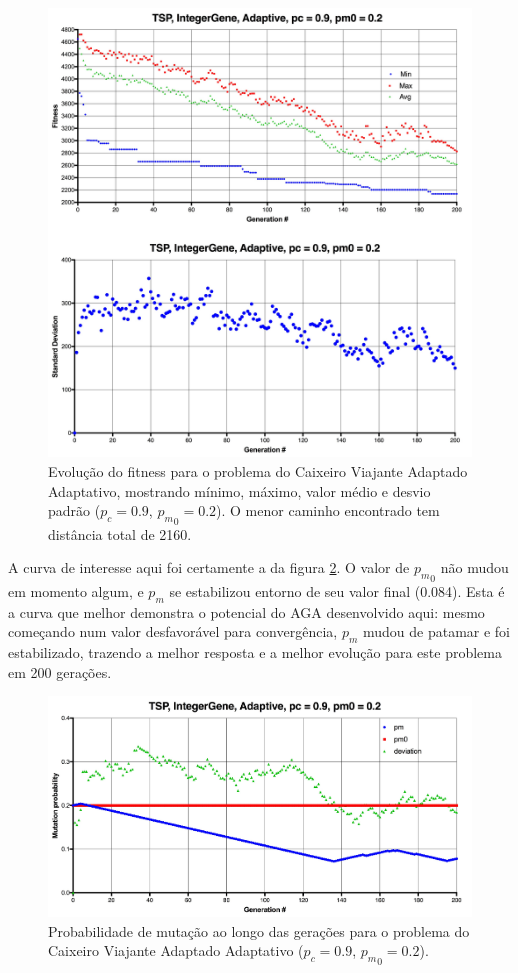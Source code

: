 \begin{figure}[ht!]
    \centering \includegraphics[width=1.0\textwidth]{tsp_02_adaptive.jpg}
    \caption{Evolução do fitness para o problema do Caixeiro Viajante Adaptado Adaptativo, mostrando mínimo, máximo, valor médio e desvio padrão ($p_c=0.9$, ${p_m}_0=0.2$). O menor caminho encontrado tem distância total de 2160.}
    \label{fig:tsp_02_adaptative}
\end{figure}

A curva de interesse aqui foi certamente a da figura \ref{fig:tsp_02_adaptive_pm}. O valor de ${p_m}_0$ não mudou em momento algum, e $p_m$ se estabilizou entorno de seu valor final (0.084). Esta é a curva que melhor demonstra o potencial do AGA desenvolvido aqui: mesmo começando num valor desfavorável para convergência, $p_m$ mudou de patamar e foi estabilizado, trazendo a melhor resposta e a melhor evolução para este problema em 200 gerações.

\begin{figure}[ht!]
    \centering \includegraphics[width=1.0\textwidth]{tsp_02_adaptive_pm.jpg}
    \caption{Probabilidade de mutação ao longo das gerações para o problema do Caixeiro Viajante Adaptado Adaptativo ($p_c=0.9$, ${p_m}_0=0.2$).}
    \label{fig:tsp_02_adaptive_pm}
\end{figure}

